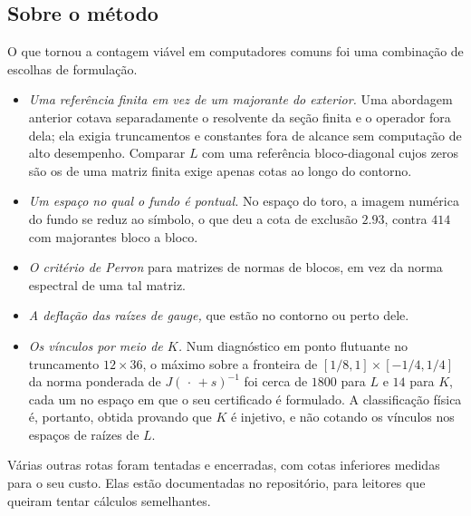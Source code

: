 \subsection{Sobre o método}

O que tornou a contagem viável em computadores comuns foi uma combinação de escolhas de formulação.
\begin{itemize}[leftmargin=*]
\item \emph{Uma referência finita em vez de um majorante do exterior.} Uma abordagem anterior cotava separadamente o resolvente
  da seção finita e o operador fora dela; ela exigia truncamentos e constantes fora de alcance
  sem computação de alto desempenho. Comparar $L$ com uma referência bloco-diagonal cujos zeros são os de uma
  matriz finita exige apenas cotas ao longo do contorno.
\item \emph{Um espaço no qual o fundo é pontual.} No espaço do toro, a imagem numérica do fundo
  se reduz ao símbolo, o que deu a cota de exclusão $2.93$, contra $414$ com majorantes bloco a bloco.
\item \emph{O critério de Perron} para matrizes de normas de blocos, em vez da norma espectral de uma tal matriz.
\item \emph{A deflação das raízes de gauge,} que estão no contorno ou perto dele.
\item \emph{Os vínculos por meio de $K$.} Num diagnóstico em ponto flutuante no truncamento $12\times36$, o máximo
  sobre a fronteira de $[1/8,1]\times[-1/4,1/4]$ da norma ponderada de $J(\,\cdot\,+s)^{-1}$ foi cerca de $1800$ para
  $L$ e $14$ para $K$, cada um no espaço em que o seu certificado é formulado. A classificação física é, portanto, obtida
  provando que $K$ é injetivo, e não cotando os vínculos nos espaços de raízes de $L$.
\end{itemize}
Várias outras rotas foram tentadas e encerradas, com cotas inferiores medidas para o seu custo. Elas estão documentadas no
repositório, para leitores que queiram tentar cálculos semelhantes.

